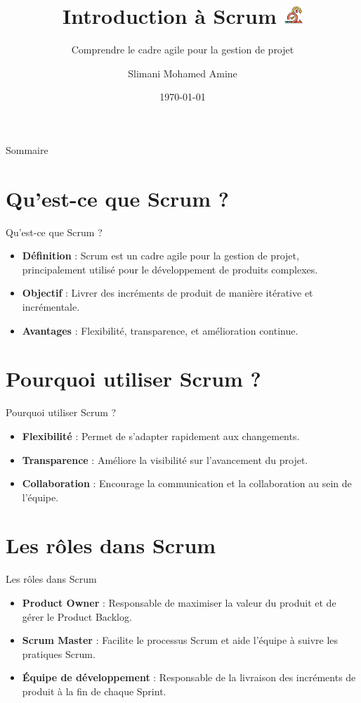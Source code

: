 \documentclass{clbeamer2024}
\title{
        Introduction à Scrum
	\includegraphics[width=0.7cm]{logos/scrum.png} \hfill
}
\subtitle{Comprendre le cadre agile pour la gestion de projet}
\author{Slimani Mohamed Amine}
\institute{EHTP}
\date{\today}
\begin{document}
	\setcounter{framenumber}{-1}
	\frame{\titlepage}
	
	
	
	\begin{frame}{Sommaire}
		\tableofcontents
	\end{frame}
	
	
	\section{Qu'est-ce que Scrum ?}
	\begin{frame}{Qu'est-ce que Scrum ?}
		\begin{itemize}
			\item \textbf{Définition} : Scrum est un cadre agile pour la gestion de projet, principalement utilisé pour le développement de produits complexes.
			\item \textbf{Objectif} : Livrer des incréments de produit de manière itérative et incrémentale.
			\item \textbf{Avantages} : Flexibilité, transparence, et amélioration continue.
		\end{itemize}
	\end{frame}
	
	\section{Pourquoi utiliser Scrum ?}
	\begin{frame}{Pourquoi utiliser Scrum ?}
		\begin{itemize}
			\item \textbf{Flexibilité} : Permet de s'adapter rapidement aux changements.
			\item \textbf{Transparence} : Améliore la visibilité sur l'avancement du projet.
			\item \textbf{Collaboration} : Encourage la communication et la collaboration au sein de l'équipe.
		\end{itemize}
	\end{frame}
	
	\section{Les rôles dans Scrum}
	\begin{frame}{Les rôles dans Scrum}
		\begin{itemize}
			\item \textbf{Product Owner} : Responsable de maximiser la valeur du produit et de gérer le Product Backlog.
			\item \textbf{Scrum Master} : Facilite le processus Scrum et aide l'équipe à suivre les pratiques Scrum.
			\item \textbf{Équipe de développement} : Responsable de la livraison des incréments de produit à la fin de chaque Sprint.
		\end{itemize}
	\end{frame}
	
\end{document}
